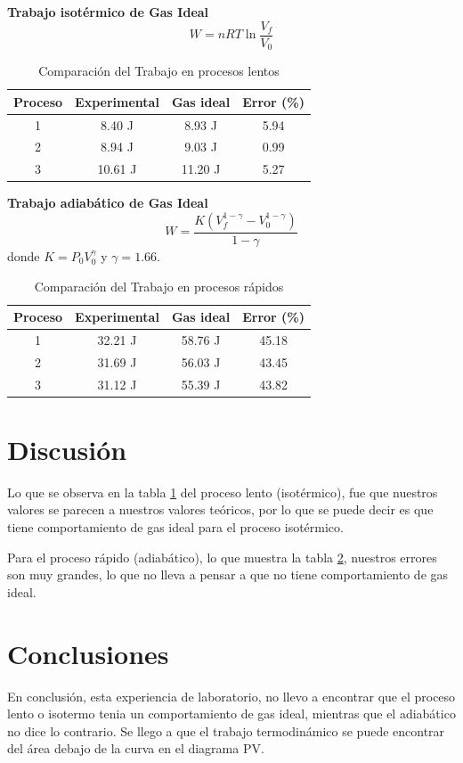 \documentclass[12pt]{article}
\begin{document}
\textbf{Trabajo isotérmico de Gas Ideal}
$$W=nRT\ln\frac{V_f}{V_0}$$
\begin{table}[H]
\centering
\begin{tabular}{|c|c|c|c|}
\hline
Proceso & Experimental & Gas ideal& Error (\%) \\ \hline
1 & 8.40  J & 8.93  J & 5.94 \\ \hline
2 & 8.94  J & 9.03  J & 0.99 \\ \hline
3 & 10.61 J & 11.20 J & 5.27 \\ \hline
\end{tabular}
\caption{Comparación del Trabajo en procesos lentos}
\label{tab:traIsocomp}
\end{table}

\textbf{Trabajo adiabático de Gas Ideal}
$$ W = \frac{K(V_f^{1-\gamma}- V_0^{1-\gamma})}{1-\gamma} $$
donde $K =P_0V_0^\gamma $ y $\gamma =1.66$.

\begin{table}[H]
\centering
\begin{tabular}{|c|c|c|c|}
\hline
Proceso & Experimental & Gas ideal& Error (\%) \\ \hline
1 & 32.21 J & 58.76 J & 45.18 \\ \hline
2 & 31.69 J & 56.03 J & 43.45 \\ \hline
3 & 31.12 J & 55.39 J & 43.82 \\ \hline
\end{tabular}
\caption{Comparación del Trabajo en procesos rápidos}
\label{tab:traAdbcomp}
\end{table}


\section{Discusión}
Lo que se observa en la tabla \ref{tab:traIsocomp} del proceso lento (isotérmico), fue que nuestros valores se parecen a nuestros valores teóricos, por lo que se puede decir es que tiene comportamiento de gas ideal para el proceso isotérmico.

Para el proceso rápido (adiabático), lo que muestra la tabla \ref{tab:traAdbcomp}, nuestros errores son muy grandes, lo que no lleva a pensar a que no tiene comportamiento de gas ideal.
\section{Conclusiones}
En conclusión, esta experiencia de laboratorio, no llevo a encontrar que el proceso lento o isotermo tenia un comportamiento de gas ideal, mientras que el adiabático no dice lo contrario. Se llego a que el trabajo termodinámico se puede encontrar del área debajo de la curva en el diagrama PV.
\end{document}
